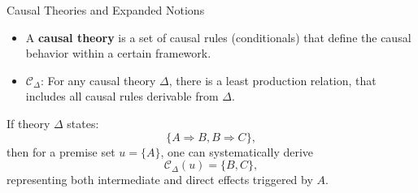 \documentclass{beamer} %
\begin{document}
\begin{frame}{Causal Theories and Expanded Notions}

    \begin{itemize}
        \item A \textbf{causal theory} is a set of causal rules (conditionals) that define the causal behavior within a certain framework.
        
        \item $ \mathcal{C}_{\Delta} $: For any causal theory $ \Delta $, there is a least production relation, that includes all causal rules derivable from $ \Delta $.

    \end{itemize}

\bigskip
    \begin{exampleblock}{}
    If theory $ \Delta $ states:
    $$
    \{A \Rightarrow B, B \Rightarrow C\},
    $$
    then for a premise set $ u = \{A\} $, one can systematically derive
    $$
    \mathcal{C}_{\Delta}(u) = \{B, C\},
    $$
    representing both intermediate and direct effects triggered by $ A $.
        
    \end{exampleblock}
\end{frame}
\end{document}
